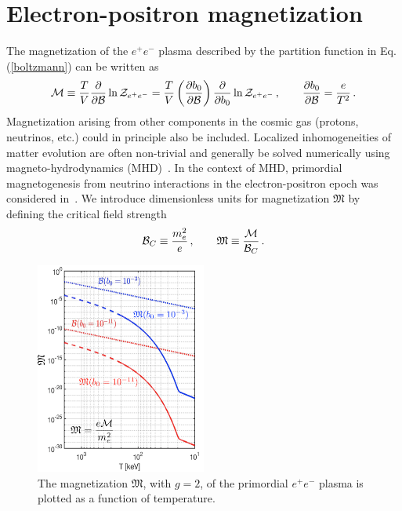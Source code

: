 \documentclass[a4paper]{article}
\newcommand{\req}[1]{Eq.\,(\ref{#1})}
\begin{document}
\section{Electron-positron magnetization}
\label{sec:magnetization}
\noindent The magnetization of the $e^{+}e^{-}$ plasma described by the partition function in \req{boltzmann} can be written as
\begin{align}
    \label{defmagetization}
    {\cal M}\equiv\frac{T}{V}\frac{\partial}{\partial{\cal B}}\ln{{\cal Z}_{e^{+}e^{-}}} = \frac{T}{V}\left(\frac{\partial b_{0}}{\partial{\cal B}}\right)\frac{\partial}{\partial b_{0}}\ln{{\cal Z}_{e^{+}e^{-}}}\,,\qquad\frac{\partial b_{0}}{\partial{\cal B}}=\frac{e}{T^{2}}\,.
\end{align}
Magnetization arising from other components in the cosmic gas (protons, neutrinos, etc.) could in principle also be included. Localized inhomogeneities of matter evolution are often non-trivial and generally be solved numerically using magneto-hydrodynamics (MHD)~\cite{melrose2008quantum,vazza2017simulations}. In the context of MHD, primordial magnetogenesis from neutrino interactions in the electron-positron epoch was considered in~\cite{perrone2021neutrinoelectron}. We introduce dimensionless units for magnetization ${\mathfrak M}$ by defining the critical field strength
\begin{align}
    {\cal B}_{C}\equiv\frac{m_{e}^{2}}{e}\,,\qquad{\mathfrak M}\equiv\frac{\cal M}{{\cal B}_{C}}\,.
\end{align}

\begin{figure}[ht]
    \centering
    \includegraphics[width=0.5\textwidth]{Magnetization_Hc_new004.png}
    \caption{The magnetization ${\mathfrak M}$, with $g=2$, of the primordial $e^{+}e^{-}$ plasma is plotted as a function of temperature.}
    \label{fig:magnet} 
\end{figure}
\end{document}
